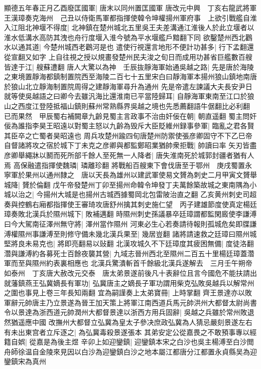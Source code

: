 顯德五年春正月乙酉廢匡國軍|{
	唐末以同州置匡國軍}
唐改元中興　丁亥右龍武將軍王漢璋奏克海州　己丑以侍衛馬軍都指揮使韓令坤權揚州軍府事　上欲引戰艦自淮入江阻北神堰不得度|{
	北神鎮在楚州城北五里吳王夫差溝通江淮後人於此立堰者以淮水低溝水高防其洩也舟行度堰入淮今號為平水堰艦戶黯翻下同}
欲鑿楚州西北鸛水以通其道|{
	今楚州城西老鸛河是也}
遣使行視還言地形不便計功甚多|{
	行下孟翻還從宣翻又如字}
上自往視之授以規畫發楚州民夫浚之旬日而成用功甚省巨艦數百艘皆達于江|{
	艘蘇遭翻}
唐人大驚以為神　壬辰抜靜海軍始通吳越之路|{
	先是唐於海陵之東境置靜海都鎮制置院西至海陵二百七十五里宋白曰靜海軍本揚州狼山鎮地南唐於狼山北立靜海制置院周得之建靜海軍尋升為通州}
先是帝遣左諫議大夫長安尹日就等使吳越語之曰卿今去雖汎海比還淮南已平當陸歸耳|{
	自靜海軍東南至江口於狼山之西度江登陸抵福山鎮則蘇州常熟縣界吳越之境也先悉薦翻語牛倨翻比必利翻}
已而果然　甲辰蜀右補闕章九齡見蜀主言政事不治由奸佞在朝|{
	朝直遥翻}
蜀主問奸佞為誰指李昊王昭遠以對蜀主怒以九齡為毁斥大臣貶維州録事參軍|{
	臨亂之君各賢其臣卒之亡蜀者昊昭遠也}
周兵攻楚州踰四旬唐楚州防禦使張彦卿固守不下乙巳帝自督諸將攻之宿於城下丁未克之彦卿與都監鄭昭業猶帥衆拒戰|{
	帥讀曰率}
矢刃皆盡彦卿舉繩牀以鬭而死所部千餘人至死無一人降者|{
	唐失淮南死於城郭封疆者猶有人焉}
高保融遣指揮使魏璘|{
	璘離珍翻}
將戰船百艘東下會伐唐至于鄂州　庚戌蜀置永寧軍於果州以通州隸之　唐以天長為雄州以建武軍使易文贇為刺史二月甲寅文贇舉城降|{
	贇於倫翻}
戊午帝發楚州丁卯至揚州命韓令坤發丁夫萬餘築故城之東南隅為小城以治之|{
	今揚州大城是也揚州古城西據蜀岡北包雷陂治直之翻}
乙亥黄州刺史司超奏與控鶴右廂都指揮使王審琦攻唐舒州擒其刺史施仁望　丙子建雄節度使真定楊廷璋奏敗北漢兵於隰州城下|{
	敗補邁翻}
時隰州刺史孫議暴卒廷璋謂都監閑廄使李謙溥曰今大駕南征澤州無守將|{
	澤州當作隰州}
河東必生心若奏請待報則孤城危矣即牒謙溥權隰州事謙溥至則修守備未幾北漢兵果至|{
	幾居豈翻}
諸將請速救之廷璋曰隰州城堅將良未易克也|{
	將即亮翻易以䜴翻}
北漢攻城久不下廷璋度其疲困無備|{
	度徒洛翻}
濳與謙溥約各募死士百餘夜襲其營|{
	九域志晉州西北至隰州二百五十里楊廷璋蓋濳軍而至與隰州約表裏相應也}
北漢兵驚潰斬首千餘級北漢兵遂解去　三月壬午朔帝如泰州　丁亥唐大赦改元交泰　唐太弟景遂前後凡十表辭位且言今國危不能扶請出就藩鎮燕王弘冀嫡長有軍功|{
	弘冀唐主之嫡長子軍功謂用柴克弘敗吳越兵以解常州之圍也事見上卷三年長知兩翻}
宜為嗣謹奏上太弟寶冊|{
	上時掌翻}
齊王景達亦以敗軍辭元帥唐主乃立景遂為晉王加天策上將軍江南西道兵馬元帥洪州大都督太尉尚書令以景達為浙西道元帥潤州大都督景達以浙西方用兵固辭|{
	吳越之兵雖於常州敗退然猶遥應中國}
改撫州大都督立弘冀為皇太子參决庶政弘冀為人猜忌嚴刻景遂左右有未出東宫者立斥逐之|{
	為弘冀毒殺景遂張本}
其弟安定公從嘉畏之不敢預事專以經籍自娯|{
	從嘉是為後主煜}
辛卯上如迎鑾鎮|{
	迎鑾鎮本宋之白沙也吳主楊溥至白沙閲舟師徐温自金陵來見因以白沙為迎鑾鎮白沙之地本屬江都唐分江都置永貞縣吴為迎鑾鎮宋為真州}
